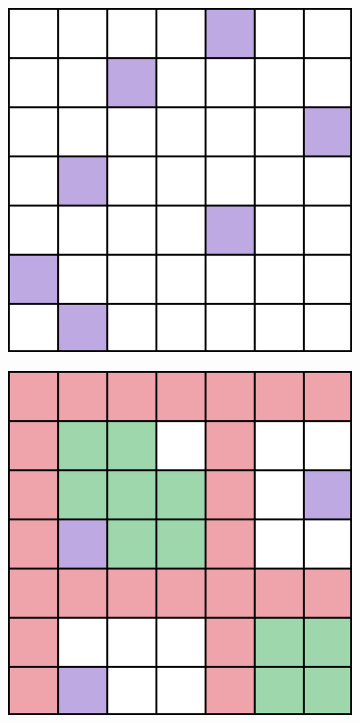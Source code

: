 \begin{figure}
\begin{subfigure}{0.15\textwidth}
        \caption{}\label{fig:attn_pattern_global}
    \end{subfigure}
    \begin{subfigure}{0.15\textwidth}
        \centering
        \includegraphics[width=\textwidth]{./img/random_attention.png}
        \caption{}\label{fig:attn_pattern_random}
    \end{subfigure}
    \begin{subfigure}{0.15\textwidth}
        \centering
        \includegraphics[width=\textwidth]{./img/mix_attention.png}
        \caption{}\label{fig:attn_pattern_combination}
    \end{subfigure}


\end{figure}

